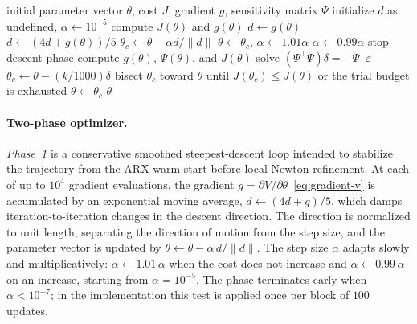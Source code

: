 \documentclass[acmsmall,screen,review]{acmart}
\begin{document}
\begin{algorithm}
\caption{PEM optimization core for non-convex criteria}
\label{alg:nonlinear-pem-core}
\begin{algorithmic}[1]
\REQUIRE initial parameter vector \(\theta\), cost \(J\), gradient \(g\), sensitivity matrix \(\Psi\)
\STATE initialize \(d\) as undefined, \(\alpha \leftarrow 10^{-5}\)
  \STATE compute \(J(\theta)\) and \(g(\theta)\)
    \STATE \(d \leftarrow g(\theta)\)
  \ELSE
    \STATE \(d \leftarrow (4d + g(\theta))/5\)
  \ENDIF
  \STATE \(\theta_c \leftarrow \theta - \alpha d/\|d\|\)
    \STATE \(\theta \leftarrow \theta_c\), \(\alpha \leftarrow 1.01\alpha\)
  \ELSE
    \STATE \(\alpha \leftarrow 0.99\alpha\)
  \ENDIF
    \STATE stop descent phase
  \ENDIF
\ENDFOR
{}
  \STATE compute \(g(\theta)\), \(\Psi(\theta)\), and \(J(\theta)\)
  \STATE solve \((\Psi^\top\Psi)\delta = -\Psi^\top\varepsilon\)
  \STATE \(\theta_c \leftarrow \theta - (k/1000)\delta\)
  \STATE bisect \(\theta_c\) toward \(\theta\) until \(J(\theta_c) \leq J(\theta)\) or the trial budget is exhausted
    \STATE \(\theta \leftarrow \theta_c\)
  \ENDIF
\ENDFOR
\STATE \RETURN \(\theta\)
\end{algorithmic}
\end{algorithm}

\paragraph{Two-phase optimizer.}
\emph{Phase~1} is a conservative smoothed steepest-descent loop intended to
stabilize the trajectory from the ARX warm start before local Newton
refinement.  At each of up to $10^4$ gradient evaluations, the
gradient $g = \partial V/\partial\theta$~\eqref{eq:gradient-v} is accumulated
by an exponential moving average, $d \leftarrow (4d + g)/5$, which damps
iteration-to-iteration changes in the descent direction.  The direction is
normalized to unit length, separating the direction of motion from the step
size, and the parameter vector is updated by
$\theta \leftarrow \theta - \alpha\,d/\|d\|$.  The step size $\alpha$ adapts
slowly and multiplicatively: $\alpha \leftarrow 1.01\,\alpha$ when the cost
does not increase and $\alpha \leftarrow 0.99\,\alpha$ on an increase, starting
from $\alpha = 10^{-5}$.  The phase terminates early when
$\alpha < 10^{-7}$; in the implementation this test is applied once per
block of $100$ updates.
\end{document}
